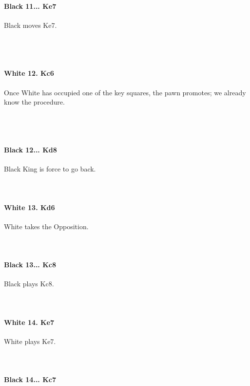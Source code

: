 \documentclass{article}
\begin{document}
\\
\\
\textbf{Black 11... Ke7}\\
\\
Black moves Ke7.\\\\
\\

\\
\\
\textbf{White 12. Kc6}\\
\\
Once White has occupied one of the key squares, the pawn promotes; we already know the procedure.\\\\
\\

\\
\\
\textbf{Black 12... Kd8}\\
\\
Black King is force to go back.\\
\\

\\
\\
\textbf{White 13. Kd6}\\
\\
White takes the Opposition.\\
\\

\\
\\
\textbf{Black 13... Kc8}\\
\\
Black plays Kc8.\\
\\

\\
\\
\textbf{White 14. Ke7}\\
\\
White plays Ke7.\\
\\

\\
\\
\textbf{Black 14... Kc7}\\
\end{document}
